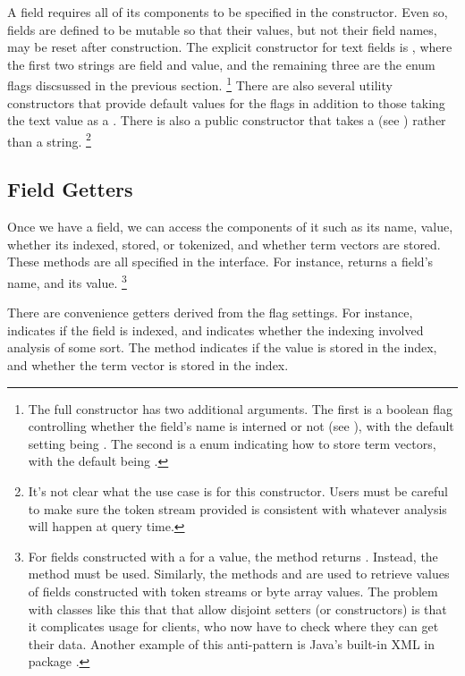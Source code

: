 A field requires all of its components to be specified in the
constructor.  Even so, fields are defined to be mutable so that their
values, but not their field names, may be reset after construction.
The explicit constructor for text fields is
,
where the first two strings are field and value, and the remaining
three are the enum flags discsussed in the previous section.%
%
\footnote{The full constructor has two additional arguments.  The
  first is a boolean flag controlling whether the field's name is
  interned or not (see ), with the default
  setting being .  The second is a 
  enum indicating how to store term vectors, with the default
  being .}
%
There are also several utility constructors that provide default
values for the flags in addition to those taking the text value as a
.  There is also a public constructor that takes a
 (see ) rather than a
string.%
%
\footnote{It's not clear what the use case is for this constructor.
Users must be careful to make sure the token stream provided is
consistent with whatever analysis will happen at query time.}

\subsection{Field Getters}

Once we have a field, we can access the components of it such as its
name, value, whether its indexed, stored, or tokenized, and whether
term vectors are stored.  These methods are all specified in the
 interface.  For instance,  returns
a field's name, and  its value.%
%
\footnote{For fields constructed with a  for a value, the
  method  returns .  Instead, the
  method  must be used.  Similarly, the methods
   and  are used to
  retrieve values of fields constructed with token streams or byte
  array values.  The problem with classes like this that that allow
  disjoint setters (or constructors) is that it complicates usage for
  clients, who now have to check where they can get their data.
  Another example of this anti-pattern is Java's built-in XML
   in package .}
%

There are convenience getters derived from the flag settings.  For
instance,  indicates if the field is indexed, and
 indicates whether the indexing involved analysis
of some sort.  The method  indicates if the value is
stored in the index, and  whether the term
vector is stored in the index.

